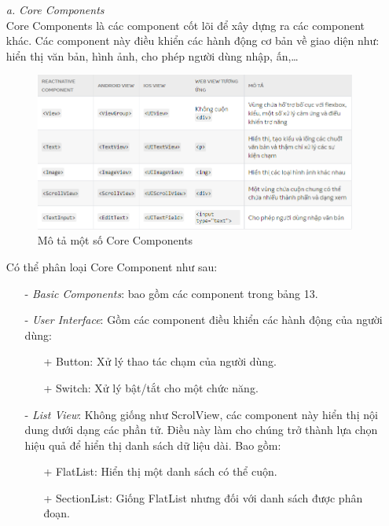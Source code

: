     \begin{enumerate}
        \item[\textit{a.}] {\textit{Core Components}}\\
        Core Components là các component cốt lõi để xây dựng ra các component khác. Các component này điều khiển các hành động cơ bản về giao diện như: hiển thị văn bản, hình ảnh, cho phép người dùng nhập, ấn,\dots\\
        \begin{figure}[!ht]
            \centering
            \includegraphics[width=1\textwidth]{images/coreComponets.png}
            \caption{Mô tả một số Core Components}
        \end{figure}
        Có thể phân loại Core Component như sau:
        \begin{enumerate}
            \item[-] {\textit{Basic Components}}: bao gồm các component trong bảng 13.
            \item[-] {\textit{User Interface}}: Gồm các component điều khiển các hành động của người dùng:
            \begin{enumerate}
                \item[+] Button: Xử lý thao tác chạm của người dùng.
                \item[+] Switch: Xử lý bật/tắt cho một chức năng.
            \end{enumerate}
            \item[-] {\textit{List View}}: Không giống như ScrolView, các component này hiển thị nội dung dưới dạng các phần tử. Điều này làm cho chúng trở thành lựa chọn hiệu quả để hiển thị danh sách dữ liệu dài. Bao gồm:
            \begin{enumerate}
                \item[+] FlatList: Hiển thị một danh sách có thể cuộn.
                \item[+] SectionList: Giống FlatList nhưng đối với danh sách được phân đoạn.

\end{enumerate}
\end{enumerate}
\end{enumerate}
